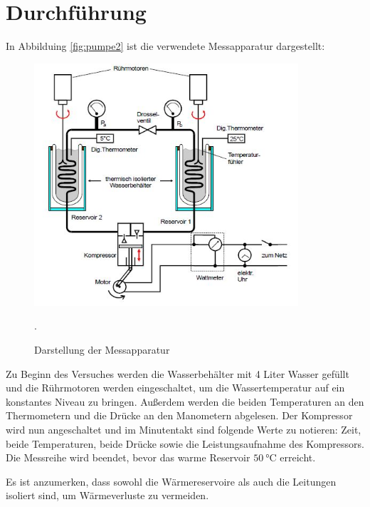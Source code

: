 \section{Durchführung}
In Abbilduing \ref{fig:pumpe2} ist die verwendete Messapparatur dargestellt:
\begin{figure}[H]
  \centering
  \includegraphics[height=9cm]{pumpe2.JPG}
  \caption{Darstellung der Messapparatur}
  \cite{skript}.
  \label{pumpe2}
\end{figure}

Zu Beginn des Versuches werden die Wasserbehälter mit 4 Liter Wasser gefüllt und
die Rührmotoren werden eingeschaltet, um die Wassertemperatur auf ein konstantes
Niveau zu bringen. Außerdem werden die beiden Temperaturen an den Thermometern und die Drücke an den Manometern abgelesen.
Der Kompressor wird nun angeschaltet und im Minutentakt sind folgende Werte zu notieren:
Zeit, beide Temperaturen, beide Drücke sowie die Leistungsaufnahme des Kompressors.
Die Messreihe wird beendet, bevor das warme Reservoir $\SI{50}{\celsius}$ erreicht.

Es ist anzumerken, dass sowohl die Wärmereservoire als auch die Leitungen isoliert sind,
um Wärmeverluste zu vermeiden.


\label{sec:Durchführung}
